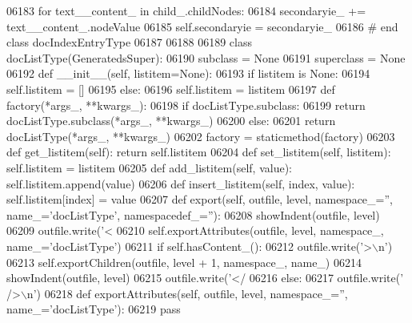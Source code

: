 \begin{DoxyCode}
{{{{{{{{{{{{{{{{{{{{{{{{{{{{{{{{{{{{{{{{{{{{{{{{{{{{{{{{{{{{{{{{{{{{{{{{{{{{{{{{{{{{{{{{{{{{{{{{{{{{{{{{{{{{{{{{{{{{{{{{{{{{{{{{{{{{{{{{{{{{{{{{{{{{{{{{{{{{{{{{{{{{{{{{{{{{{{{{{{{{{{{{{{{{{{{{{{{{{{{{{{{{{{{{{{{{{{{{{{{{{{{{{{{{{{{{{{{{{{{{{{{{{{{{{{{{{{{{{{{{{{{{{{{{{{{{{{{{{{{{{{{{{{{{{{{{{{{{{{{{{{{{{{{{{{{{{{{{{{{{{{{{{{{{{{{{{{{{{{{{{{{{{{{{{{{{{{{{{{{{{{{{{{{{{{{{{{{{{{{{{{{{{{{{06183             \textcolor{keywordflow}{for} text\_\_content\_ \textcolor{keywordflow}{in} child\_.childNodes:
06184                 secondaryie\_ += text\_\_content\_.nodeValue
06185             self.secondaryie = secondaryie\_
06186 \textcolor{comment}{# end class docIndexEntryType}
06187 
06188 
06189 \textcolor{keyword}{class }docListType(GeneratedsSuper):
06190     subclass = \textcolor{keywordtype}{None}
06191     superclass = \textcolor{keywordtype}{None}
06192     \textcolor{keyword}{def }__init__(self, listitem=None):
06193         \textcolor{keywordflow}{if} listitem \textcolor{keywordflow}{is} \textcolor{keywordtype}{None}:
06194             self.listitem = []
06195         \textcolor{keywordflow}{else}:
06196             self.listitem = listitem
06197     \textcolor{keyword}{def }factory(*args\_, **kwargs\_):
06198         \textcolor{keywordflow}{if} docListType.subclass:
06199             \textcolor{keywordflow}{return} docListType.subclass(*args\_, **kwargs\_)
06200         \textcolor{keywordflow}{else}:
06201             \textcolor{keywordflow}{return} docListType(*args\_, **kwargs\_)
06202     factory = staticmethod(factory)
06203     \textcolor{keyword}{def }get_listitem(self): \textcolor{keywordflow}{return} self.listitem
06204     \textcolor{keyword}{def }set_listitem(self, listitem): self.listitem = listitem
06205     \textcolor{keyword}{def }add_listitem(self, value): self.listitem.append(value)
06206     \textcolor{keyword}{def }insert_listitem(self, index, value): self.listitem[index] = value
06207     \textcolor{keyword}{def }export(self, outfile, level, namespace\_='', name\_='docListType', namespacedef\_=''):
06208         showIndent(outfile, level)
06209         outfile.write(\textcolor{stringliteral}{'<%
06210         self.exportAttributes(outfile, level, namespace\_, name\_=\textcolor{stringliteral}{'docListType'})
06211         \textcolor{keywordflow}{if} self.hasContent_():
06212             outfile.write(\textcolor{stringliteral}{'>\(\backslash\)n'})
06213             self.exportChildren(outfile, level + 1, namespace\_, name\_)
06214             showIndent(outfile, level)
06215             outfile.write(\textcolor{stringliteral}{'</%
06216         \textcolor{keywordflow}{else}:
06217             outfile.write(\textcolor{stringliteral}{' />\(\backslash\)n'})
06218     \textcolor{keyword}{def }exportAttributes(self, outfile, level, namespace\_='', name\_='docListType'):
06219         \textcolor{keywordflow}{pass}
}}}}}}}}}}}}}}}}}}}}}}}}}}}}}}}}}}}}}}}}}}}}}}}}}}}}}}}}}}}}}}}}}}}}}}}}}}}}}}}}}}}}}}}}}}}}}}}}}}}}}}}}}}}}}}}}}}}}}}}}}}}}}}}}}}}}}}}}}}}}}}}}}}}}}}}}}}}}}}}}}}}}}}}}}}}}}}}}}}}}}}}}}}}}}}}}}}}}}}}}}}}}}}}}}}}}}}}}}}}}}}}}}}}}}}}}}}}}}}}}}}}}}}}}}}}}}}}}}}}}}}}}}}}}}}}}}}}}}}}}}}}}}}}}}}}}}}}}}}}}}}}}}}}}}}}}}}}}}}}}}}}}}}}}}}}}}}}}}}}}}}}}}}}}}}}}}}}}}}}}}}}}}}}}}}}}}}}}}}}}}}}}}}}}}}
\end{DoxyCode}
